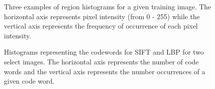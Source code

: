 \documentclass[10pt,letterpaper]{article}
\begin{document}
\begin{figure}[p]
\centering
{}
\hspace{5mm}
\hspace{5mm}

\caption{Three examples of region histograms for a given training image. The horizontal axis represents pixel intensity (from 0 - 255) while the vertical axis represents the frequency of occurrence of each pixel intensity.}
\label{part2lbphist}
\end{figure}

\begin{figure}[p]
\centering
{}
\hspace{5mm}
\hspace{5mm}
\hspace{5mm}

\caption{Histograms representing the codewords for SIFT and LBP for two select images.  The horizontal axis represents the number of code words and the vertical axis represents the number occurrences of a given code word.}
\label{part2codewords}
\end{figure}
\end{document}
